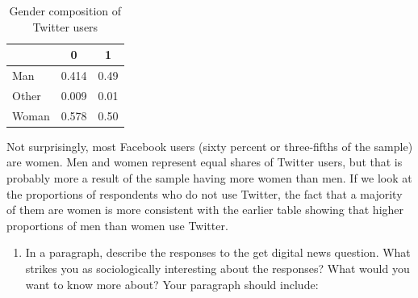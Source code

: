 \documentclass[
  letterpaper,
  DIV=11,
  numbers=noendperiod]{scrartcl}
\newenvironment{Shaded}{\begin{snugshade}}{\end{snugshade}}
\newcommand{\AttributeTok}[1]{\textcolor[rgb]{0.40,0.45,0.13}{#1}}
\newcommand{\ConstantTok}[1]{\textcolor[rgb]{0.56,0.35,0.01}{#1}}
\newcommand{\DecValTok}[1]{\textcolor[rgb]{0.68,0.00,0.00}{#1}}
\newcommand{\FunctionTok}[1]{\textcolor[rgb]{0.28,0.35,0.67}{#1}}
\newcommand{\NormalTok}[1]{\textcolor[rgb]{0.00,0.23,0.31}{#1}}
\newcommand{\SpecialCharTok}[1]{\textcolor[rgb]{0.37,0.37,0.37}{#1}}
\newcommand{\StringTok}[1]{\textcolor[rgb]{0.13,0.47,0.30}{#1}}
\providecommand{\tightlist}{%
  \setlength{\itemsep}{0pt}\setlength{\parskip}{0pt}}\usepackage{longtable,booktabs,array}
\begin{document}
\begin{Shaded}
\end{Shaded}

\begin{table}[!h]

\caption{Gender composition of Twitter users}
\centering
\begin{tabular}[t]{lcc}
\toprule
  & 0 & 1\\
\midrule
Man & 0.414 & 0.49\\
Other & 0.009 & 0.01\\
Woman & 0.578 & 0.50\\
\bottomrule
\end{tabular}
\end{table}

Not surprisingly, most Facebook users (sixty percent or three-fifths of
the sample) are women. Men and women represent equal shares of Twitter
users, but that is probably more a result of the sample having more
women than men. If we look at the proportions of respondents who do not
use Twitter, the fact that a majority of them are women is more
consistent with the earlier table showing that higher proportions of men
than women use Twitter.

\begin{enumerate}
\def\labelenumi{\arabic{enumi}.}
\setcounter{enumi}{1}
\tightlist
\item
  In a paragraph, describe the responses to the get digital news
  question. What strikes you as sociologically interesting about the
  responses? What would you want to know more about? Your paragraph
  should include:
\end{enumerate}
\end{document}
